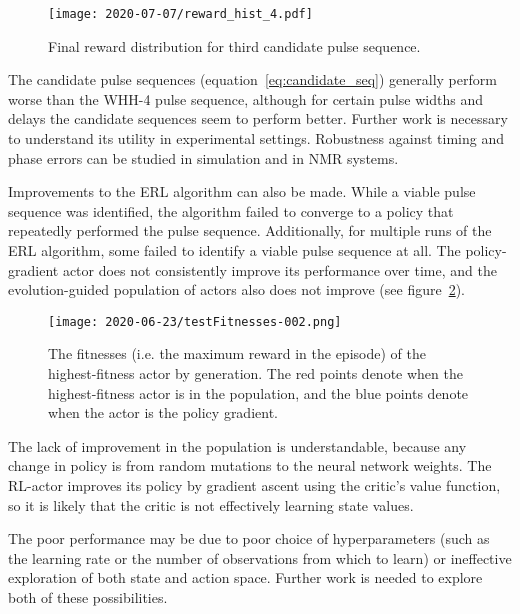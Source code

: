 \documentclass{article}
\begin{document}
\begin{figure}[H]
    \centering
    \texttt{[image: 2020-07-07/reward\_hist\_4.pdf]}
    \caption{Final reward distribution for third candidate pulse sequence.}
    \label{fig:candidate_3}
\end{figure}

The candidate pulse sequences (equation~\ref{eq:candidate_seq}) generally perform worse than the WHH-4 pulse sequence, although for certain pulse widths and delays the candidate sequences seem to perform better. Further work is necessary to understand its utility in experimental settings. Robustness against timing and phase errors can be studied in simulation and in NMR systems.

Improvements to the ERL algorithm can also be made. While a viable pulse sequence was identified, the algorithm failed to converge to a policy that repeatedly performed the pulse sequence. Additionally, for multiple runs of the ERL algorithm, some failed to identify a viable pulse sequence at all. The policy-gradient actor does not consistently improve its performance over time, and the evolution-guided population of actors also does not improve (see figure~\ref{fig:results}).
\begin{figure}[H]
    \centering
    \texttt{[image: 2020-06-23/testFitnesses-002.png]}
    \caption{The fitnesses (i.e. the maximum reward in the episode) of the highest-fitness actor by generation. The red points denote when the highest-fitness actor is in the population, and the blue points denote when the actor is the policy gradient.}
    \label{fig:results}
\end{figure}
The lack of improvement in the population is understandable, because any change in policy is from random mutations to the neural network weights. The RL-actor improves its policy by gradient ascent using the critic's value function, so it is likely that the critic is not effectively learning state values.

The poor performance may be due to poor choice of hyperparameters (such as the learning rate or the number of observations from which to learn) or ineffective exploration of both state and action space.
Further work is needed to explore both of these possibilities.

\printbibliography
\end{document}
